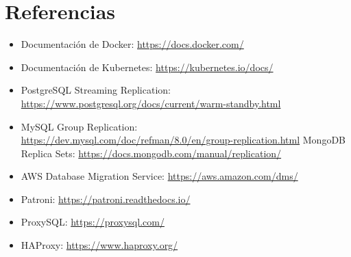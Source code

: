 \documentclass[12pt,a4paper,openany,oneside]{book}
\begin{document}
\chapter*{Referencias}
\begin{itemize}
    \item Documentación de Docker: \url{https://docs.docker.com/}
    \item Documentación de Kubernetes: \url{https://kubernetes.io/docs/}
    \item PostgreSQL Streaming Replication: \url{https://www.postgresql.org/docs/current/warm-standby.html}
    \item MySQL Group Replication: \url{https://dev.mysql.com/doc/refman/8.0/en/group-replication.html}
    \itme MongoDB Replica Sets: \url{https://docs.mongodb.com/manual/replication/}
    \item AWS Database Migration Service: \url{https://aws.amazon.com/dms/}
    \item Patroni: \url{https://patroni.readthedocs.io/}
    \item ProxySQL: \url{https://proxysql.com/}
    \item HAProxy: \url{https://www.haproxy.org/}
\end{itemize}
\end{document}
